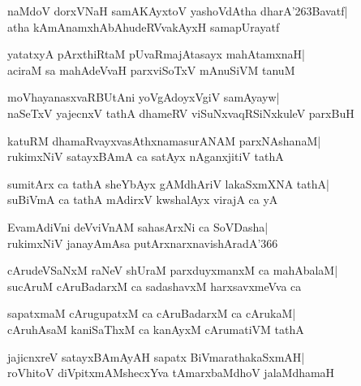 \documentclass[twoside,12pt,openright]{book}
\def\S{\char'263}
\newcounter{shloka}[chapter]
\begin{document}
\begin{shloka}%
naMdoV dorxVNaH samAKAyxtoV yashoVdAtha dharA\S Bavatf|\\
atha kAmAnamxhAbAhudeRVvakAyxH samapUrayatf
\end{shloka}

\begin{shloka}%
yatatxyA pArxthiRtaM pUvaRmajAtasayx mahAtamxnaH|\\
aciraM sa mahAdeVvaH parxviSoTxV mAnuSiVM tanuM
\end{shloka}

\begin{shloka}%
moVhayanasxvaRBUtAni yoVgAdoyxVgiV samAyayw|\\
naSeTxV yajecnxV tathA dhameRV viSuNxvaqRSiNxkuleV parxBuH
\end{shloka}

\begin{shloka}%
katuRM dhamaRvayxvasAthxnamasurANAM parxNAshanaM|\\
rukimxNiV satayxBAmA ca satAyx nAganxjitiV tathA
\end{shloka}

\begin{shloka}%
sumitArx ca tathA sheYbAyx gAMdhAriV lakaSxmXNA tathA|\\
suBiVmA ca tathA mAdirxV kwshalAyx virajA ca yA
\end{shloka}

\begin{shloka}%
EvamAdiVni deVviVnAM sahasArxNi ca SoVDasha|\\
rukimxNiV janayAmAsa putArxnarxnavishAradA\char'366
\end{shloka}

\begin{shloka}%
cArudeVSaNxM raNeV shUraM parxduyxmanxM ca mahAbalaM|\\
sucAruM cAruBadarxM ca sadashavxM harxsavxmeVva ca
\end{shloka}

\begin{shloka}%
sapatxmaM cArugupatxM ca cAruBadarxM ca cArukaM|\\
cAruhAsaM kaniSaThxM ca kanAyxM cArumatiVM tathA
\end{shloka}

\begin{shloka}%
jajicnxreV satayxBAmAyAH sapatx BiVmarathakaSxmAH|\\
roVhitoV diVpitxmAMshecxYva tAmarxbaMdhoV jalaMdhamaH
\end{shloka}
\end{document}
